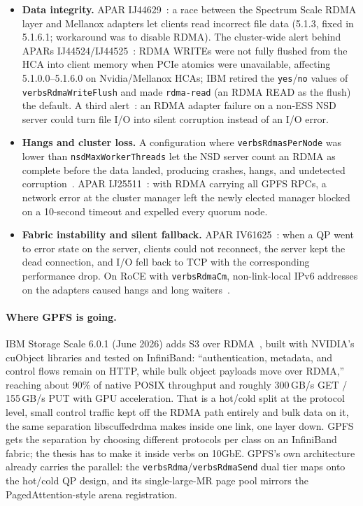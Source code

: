\documentclass[11pt,letterpaper]{article}
\begin{document}
\begin{itemize}
\item \textbf{Data integrity.} APAR IJ44629~\cite{ibm_ij44629}: a race between the Spectrum Scale RDMA layer and Mellanox adapters let clients read incorrect file data (5.1.3, fixed in 5.1.6.1; workaround was to disable RDMA). The cluster-wide alert behind APARs IJ44524/IJ44525~\cite{ibm_rdma_alert}: RDMA WRITEs were not fully flushed from the HCA into client memory when PCIe atomics were unavailable, affecting 5.1.0.0--5.1.6.0 on Nvidia/Mellanox HCAs; IBM retired the \texttt{yes}/\texttt{no} values of \texttt{verbsRdmaWriteFlush} and made \texttt{rdma-read} (an RDMA READ as the flush) the default. A third alert~\cite{ibm_nsd_adapter}: an RDMA adapter failure on a non-ESS NSD server could turn file I/O into silent corruption instead of an I/O error.
\item \textbf{Hangs and cluster loss.} A configuration where \texttt{verbsRdmasPerNode} was lower than \texttt{nsdMaxWorkerThreads} let the NSD server count an RDMA as complete before the data landed, producing crashes, hangs, and undetected corruption~\cite{ibm_gpfs_rdma_alert}. APAR IJ25511~\cite{ibm_ij25511}: with RDMA carrying all GPFS RPCs, a network error at the cluster manager left the newly elected manager blocked on a 10-second timeout and expelled every quorum node.
\item \textbf{Fabric instability and silent fallback.} APAR IV61625~\cite{ibm_iv61625}: when a QP went to error state on the server, clients could not reconnect, the server kept the dead connection, and I/O fell back to TCP with the corresponding performance drop. On RoCE with \texttt{verbsRdmaCm}, non-link-local IPv6 addresses on the adapters caused hangs and long waiters~\cite{ibm_510x}.
\end{itemize}

\paragraph{Where GPFS is going.} IBM Storage Scale 6.0.1 (June 2026) adds S3 over RDMA~\cite{ibm_s3_rdma}, built with NVIDIA's cuObject libraries and tested on InfiniBand: ``authentication, metadata, and control flows remain on HTTP, while bulk object payloads move over RDMA,'' reaching about 90\% of native POSIX throughput and roughly 300\,GB/s GET / 155\,GB/s PUT with GPU acceleration. That is a hot/cold split at the protocol level, small control traffic kept off the RDMA path entirely and bulk data on it, the same separation libscuffedrdma makes inside one link, one layer down. GPFS gets the separation by choosing different protocols per class on an InfiniBand fabric; the thesis has to make it inside verbs on 10GbE. GPFS's own architecture already carries the parallel: the \texttt{verbsRdma}/\texttt{verbsRdmaSend} dual tier maps onto the hot/cold QP design, and its single-large-MR page pool mirrors the PagedAttention-style arena registration.
\end{document}
